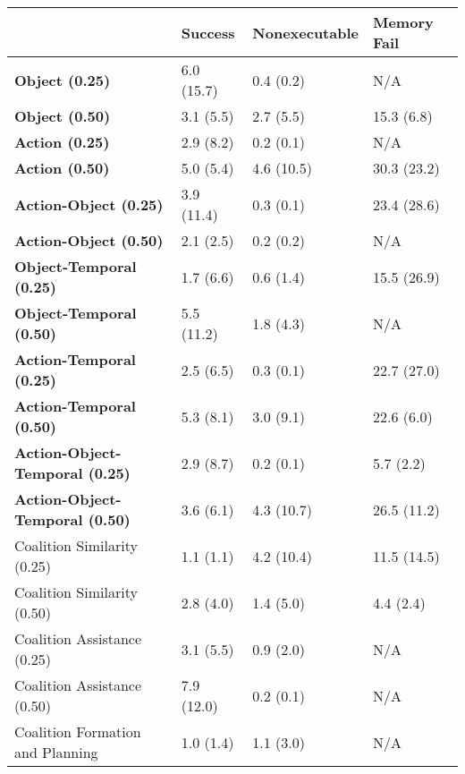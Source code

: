 \begin{tabular}{llll}
\hline
                                        & Success    & Nonexecutable   & Memory Fail   \\
\hline
 \textbf{Object (0.25)}                 & 6.0 (15.7) & 0.4 (0.2)       & N/A           \\
 \textbf{Object (0.50)}                 & 3.1 (5.5)  & 2.7 (5.5)       & 15.3 (6.8)    \\
 \textbf{Action (0.25)}                 & 2.9 (8.2)  & 0.2 (0.1)       & N/A           \\
 \textbf{Action (0.50)}                 & 5.0 (5.4)  & 4.6 (10.5)      & 30.3 (23.2)   \\
 \textbf{Action-Object (0.25)}          & 3.9 (11.4) & 0.3 (0.1)       & 23.4 (28.6)   \\
 \textbf{Action-Object (0.50)}          & 2.1 (2.5)  & 0.2 (0.2)       & N/A           \\
 \textbf{Object-Temporal (0.25)}        & 1.7 (6.6)  & 0.6 (1.4)       & 15.5 (26.9)   \\
 \textbf{Object-Temporal (0.50)}        & 5.5 (11.2) & 1.8 (4.3)       & N/A           \\
 \textbf{Action-Temporal (0.25)}        & 2.5 (6.5)  & 0.3 (0.1)       & 22.7 (27.0)   \\
 \textbf{Action-Temporal (0.50)}        & 5.3 (8.1)  & 3.0 (9.1)       & 22.6 (6.0)    \\
 \textbf{Action-Object-Temporal (0.25)} & 2.9 (8.7)  & 0.2 (0.1)       & 5.7 (2.2)     \\
 \textbf{Action-Object-Temporal (0.50)} & 3.6 (6.1)  & 4.3 (10.7)      & 26.5 (11.2)   \\
 Coalition Similarity (0.25)            & 1.1 (1.1)  & 4.2 (10.4)      & 11.5 (14.5)   \\
 Coalition Similarity (0.50)            & 2.8 (4.0)  & 1.4 (5.0)       & 4.4 (2.4)     \\
 Coalition Assistance (0.25)            & 3.1 (5.5)  & 0.9 (2.0)       & N/A           \\
 Coalition Assistance (0.50)            & 7.9 (12.0) & 0.2 (0.1)       & N/A           \\
 Coalition Formation and Planning       & 1.0 (1.4)  & 1.1 (3.0)       & N/A           \\
\hline
\end{tabular}
